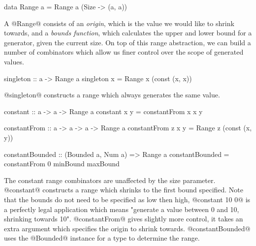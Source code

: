 \begin{code}
  data Range a =
    Range a (Size -> (a, a))
\end{code}

A @Range@ consists of an \emph{origin}, which is the value we would like to shrink towards, and a \emph{bounds function}, which calculates the upper and lower bound for a generator, given the current size. On top of this range abstraction, we can build a number of combinators which allow us finer control over the scope of generated values.

\begin{code}
  singleton :: a -> Range a
  singleton x =
    Range x (const (x, x))
\end{code}

@singleton@ constructs a range which always generates the same value.

\begin{code}
  constant :: a -> a -> Range a
  constant x y =
    constantFrom x x y

  constantFrom :: a -> a -> a -> Range a
  constantFrom z x y =
    Range z (const (x, y))

  constantBounded :: (Bounded a, Num a) => Range a
  constantBounded =
    constantFrom 0 minBound maxBound
\end{code}

The constant range combinators are unaffected by the size parameter. @constant@ constructs a range which shrinks to the first bound specified. Note that the bounds do not need to be specified as low then high, @constant 10 0@ is a perfectly legal application which means "generate a value between 0 and 10, shrinking towards 10". @constantFrom@ gives slightly more control, it takes an extra argument which specifies the origin to shrink towards. @constantBounded@ uses the @Bounded@ instance for a type to determine the range.


%
%

